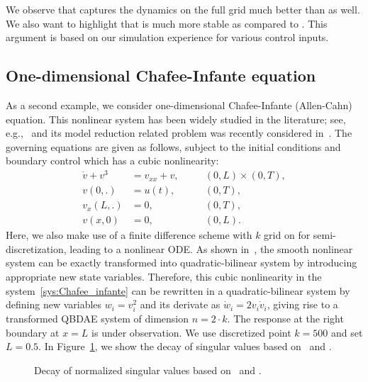We observe that {\redQBbal} captures the dynamics on the full grid much better than {\redBbal} as well. We also want to highlight that {\redQBbal} is much more stable as compared to {\redBbal}. This argument is based on our simulation experience for various control inputs.

\subsection{One-dimensional Chafee-Infante equation}
As a second example, we consider one-dimensional Chafee-Infante (Allen-Cahn) equation. This nonlinear system has been widely studied in the literature; see, e.g.,~\cite{chafee1974bifurcation,hansen2012second} and its model reduction related problem was recently considered in~\cite{morBenB15}. The governing equations are given as follows, subject to the initial conditions and boundary control  which has a cubic nonlinearity:
\begin{equation}\label{sys:Chafee_infante}
 \begin{aligned}
  \dot{v} +  v^3 &= v_{xx} + v, & \quad &(0,L)\times (0,T),\\
  v(0,.)  &= u(t), & \quad & (0,T),\\
  v_x(L,.) &= 0, & \quad & (0,T),\\
  v(x,0) &= 0, & \quad & (0,L).
 \end{aligned}
\end{equation}
Here, we also make use of a finite difference scheme with $k$ grid on for semi-discretization, leading to a nonlinear ODE. As shown in~\cite{morBenB15}, the smooth nonlinear system can be exactly transformed into quadratic-bilinear system by introducing appropriate new state variables. Therefore, this cubic nonlinearity in the system~\eqref{sys:Chafee_infante} can be rewritten  in a quadratic-bilinear system by defining  new variables $w_i = v_i^2$ and its derivate as $\dot{w}_i = 2v_i\dot{v}_i$, giving rise to a transformed QBDAE system of dimension $n = 2\cdot k$. The response at the right boundary at $x = L$ is under observation. We use discretized point $ k = 500$ and set $L = 0.5$. In Figure~\ref{fig:1D_chafee_singular}, we show the decay of singular values based on \GramQB~and \GramB.
\begin{figure}[h]
\centering
{}
	\setlength\fheight{3cm}
	\setlength\fwidth{6cm}
	
		\caption{Decay of normalized singular values based on \GramQB ~and \GramB.}
		\label{fig:1D_chafee_singular}
\end{figure}

